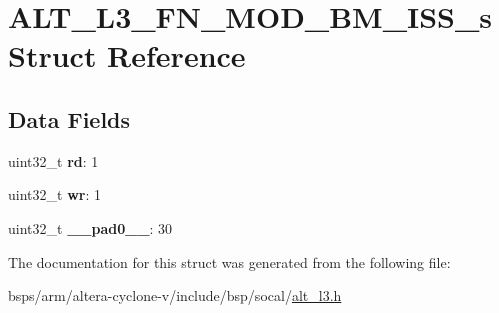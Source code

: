 \hypertarget{structALT__L3__FN__MOD__BM__ISS__s}{}\section{A\+L\+T\+\_\+\+L3\+\_\+\+F\+N\+\_\+\+M\+O\+D\+\_\+\+B\+M\+\_\+\+I\+S\+S\+\_\+s Struct Reference}
\label{structALT__L3__FN__MOD__BM__ISS__s}
\subsection*{Data Fields}
\begin{DoxyCompactItemize}
\item 
\mbox{\label{structALT__L3__FN__MOD__BM__ISS__s_a6b56404c26eb84a3fc7d7d5531cfff4c}} 
uint32\+\_\+t {\bfseries rd}\+: 1
\item 
\mbox{\label{structALT__L3__FN__MOD__BM__ISS__s_a494a88dbb0acef9ebef86bf68db7156f}} 
uint32\+\_\+t {\bfseries wr}\+: 1
\item 
\mbox{\label{structALT__L3__FN__MOD__BM__ISS__s_a57b23029fb9e5d5c59ad162e22f5a91a}} 
uint32\+\_\+t {\bfseries \+\_\+\+\_\+pad0\+\_\+\+\_\+}\+: 30
\end{DoxyCompactItemize}


The documentation for this struct was generated from the following file\+:\begin{DoxyCompactItemize}
\item 
bsps/arm/altera-\/cyclone-\/v/include/bsp/socal/\mbox{\hyperlink{alt__l3_8h}{alt\+\_\+l3.\+h}}\end{DoxyCompactItemize}
